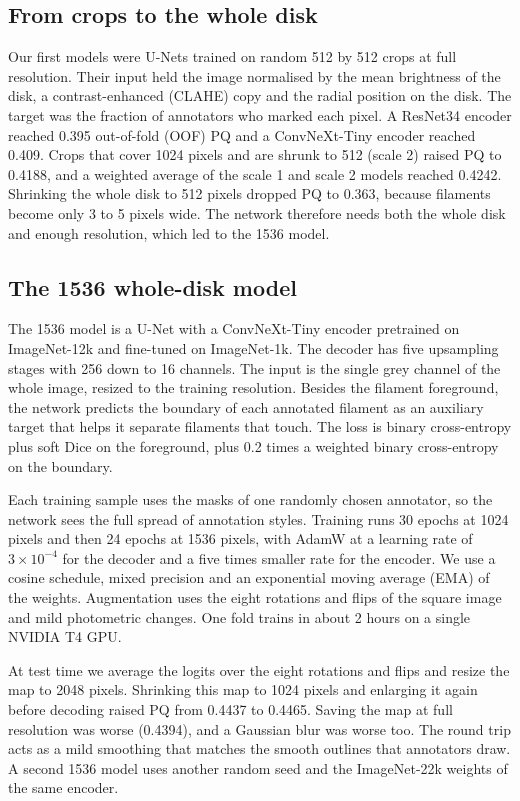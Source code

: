 \documentclass[sigconf]{acmart}
\begin{document}
\subsection{From crops to the whole disk}

Our first models were U-Nets \cite{ronneberger2015unet} trained on random 512 by 512 crops at full resolution. Their input held the image normalised by the mean brightness of the disk, a contrast-enhanced (CLAHE) copy and the radial position on the disk. The target was the fraction of annotators who marked each pixel. A ResNet34 encoder reached 0.395 out-of-fold (OOF) PQ and a ConvNeXt-Tiny encoder reached 0.409. Crops that cover 1024 pixels and are shrunk to 512 (scale 2) raised PQ to 0.4188, and a weighted average of the scale 1 and scale 2 models reached 0.4242. Shrinking the whole disk to 512 pixels dropped PQ to 0.363, because filaments become only 3 to 5 pixels wide. The network therefore needs both the whole disk and enough resolution, which led to the 1536 model.

\subsection{The 1536 whole-disk model}

The 1536 model is a U-Net with a ConvNeXt-Tiny encoder \cite{liu2022convnext} pretrained on ImageNet-12k and fine-tuned on ImageNet-1k. The decoder has five upsampling stages with 256 down to 16 channels. The input is the single grey channel of the whole image, resized to the training resolution. Besides the filament foreground, the network predicts the boundary of each annotated filament as an auxiliary target that helps it separate filaments that touch. The loss is binary cross-entropy plus soft Dice on the foreground, plus 0.2 times a weighted binary cross-entropy on the boundary.

Each training sample uses the masks of one randomly chosen annotator, so the network sees the full spread of annotation styles. Training runs 30 epochs at 1024 pixels and then 24 epochs at 1536 pixels, with AdamW at a learning rate of $3 \times 10^{-4}$ for the decoder and a five times smaller rate for the encoder. We use a cosine schedule, mixed precision and an exponential moving average (EMA) of the weights. Augmentation uses the eight rotations and flips of the square image and mild photometric changes. One fold trains in about 2 hours on a single NVIDIA T4 GPU.

At test time we average the logits over the eight rotations and flips and resize the map to 2048 pixels. Shrinking this map to 1024 pixels and enlarging it again before decoding raised PQ from 0.4437 to 0.4465. Saving the map at full resolution was worse (0.4394), and a Gaussian blur was worse too. The round trip acts as a mild smoothing that matches the smooth outlines that annotators draw. A second 1536 model uses another random seed and the ImageNet-22k weights of the same encoder.
\end{document}
